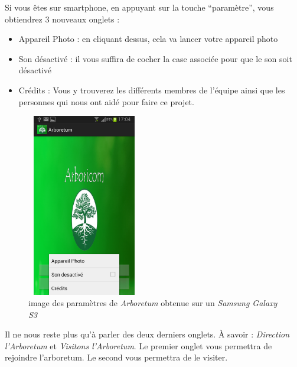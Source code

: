 \documentclass[a4paper,11pt]{article}
\begin{document}
     Si vous êtes sur smartphone, en appuyant sur la touche ``paramètre'', vous obtiendrez 3 nouveaux onglets : 
     \begin{itemize}
      \item Appareil Photo : en cliquant dessus, cela va lancer votre appareil photo 
      \item Son désactivé : il vous suffira de cocher la case associée pour que le son soit désactivé
      \item Crédits : Vous y trouverez les différents membres de l'équipe ainsi que les personnes qui nous ont aidé pour faire ce projet.
     \end{itemize}
         \begin{figure}[H]
     \begin{center}
    \includegraphics[width=5cm,height=8cm]{menuParamS3.png}
    \caption{image des paramètres de \textit{Arboretum} obtenue sur un \textit{Samsung Galaxy S3}}
     \end{center}
    \end{figure}

    
    Il ne nous reste plus qu'à parler des deux derniers onglets. À savoir : \textit{Direction l'Arboretum} et \textit{Visitons l'Arboretum}.
    Le premier onglet vous permettra de rejoindre l'arboretum. Le second vous permettra de le visiter.
    
\end{document}
